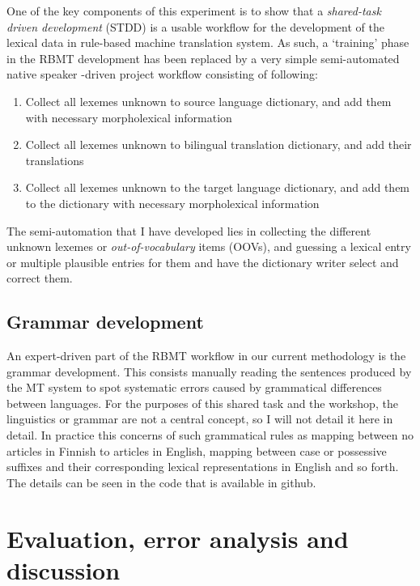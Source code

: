 \documentclass[11pt,a4paper]{article}
\begin{document}
One of the key components of this experiment is to show that a
\textit{shared-task driven development} (STDD) is a usable workflow
for the development of the lexical data in rule-based machine translation
system.  As such, a `training' phase in the RBMT development has been replaced
by a very simple semi-automated native speaker -driven project workflow
consisting of following:

\begin{enumerate}
    \item Collect all lexemes unknown to source language dictionary, and add them
        with necessary morpholexical information
    \item Collect all lexemes unknown to bilingual translation dictionary,
        and add their translations
    \item Collect all lexemes unknown to the target language dictionary,
        and add them to the dictionary with necessary morpholexical information
\end{enumerate}

The semi-automation that I have developed lies in collecting the different
unknown lexemes or \textit{out-of-vocabulary} items (OOVs), and guessing a
lexical entry or multiple plausible entries for them and have the dictionary
writer select and correct them.


\subsection{Grammar development}
\label{sec:grammar-development}

An expert-driven part of the RBMT workflow in our current methodology is the
grammar development. This consists manually reading the sentences produced by
the MT system to spot systematic errors caused by grammatical differences
between languages. For the purposes of this shared task and the workshop, the
linguistics or grammar are not a central concept, so I will not detail it here
in detail. In practice this concerns of such grammatical rules as mapping
between no articles in Finnish to articles in English, mapping between case or
possessive suffixes and their corresponding lexical representations in English
and so forth. The details can be seen in the code that is available in github.


\section{Evaluation, error analysis and discussion}
\label{sec:error-analysis}
\end{document}
